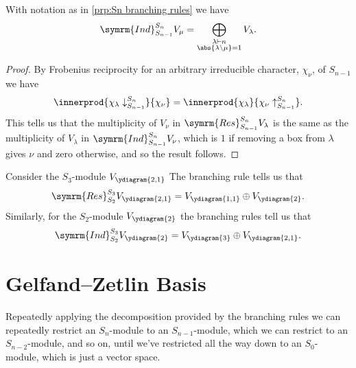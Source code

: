 \documentclass[fleqn]{NotesClass}
\newcommand{\partition}{\vdash}
\newcommand{\Res}{\symrm{Res}}
\newcommand{\Ind}{\symrm{Ind}}
\begin{document}
    
    \begin{crl}{}{}
        With notation as in \cref{prp:Sn branching rules} we have
        \begin{equation}
            \Ind^{S_n}_{S_{n-1}} V_\mu = \bigoplus_{\substack{\lambda \partition n\\ \abs{\lambda\setminus \mu} = 1}} V_\lambda.
        \end{equation}
        \begin{proof}
            By Frobenius reciprocity for an arbitrary irreducible character, \(\chi_\nu\), of \(S_{n-1}\) we have
            \begin{equation}
                \innerprod{\chi_\lambda\downarrow^{S_n}_{S_{n-1}}}{\chi_\nu} = \innerprod{\chi_\lambda}{\chi_\nu\uparrow^{S_n}_{S_{n-1}}}.
            \end{equation}
            This tells us that the multiplicity of \(V_\nu\) in \(\Res^{S_n}_{S_{n-1}}V_\lambda\) is the same as the multiplicity of \(V_\lambda\) in \(\Ind^{S_n}_{S_{n-1}}V_\nu\), which is \(1\) if removing a box from \(\lambda\) gives \(\nu\) and zero otherwise, and so the result follows.
        \end{proof}
    \end{crl}
    
    \begin{exm}{}{}
        Consider the \(S_3\)-module \(V_{\ydiagram{2,1}}\)
        The branching rule tells us that
        \begin{equation}
            \Res^{S_3}_{S_2} V_{\ydiagram{2,1}} = V_{\ydiagram{1,1}} \oplus V_{\ydiagram{2}}.
        \end{equation}
        Similarly, for the \(S_2\)-module \(V_{\ydiagram{2}}\) the branching rules tell us that
        \begin{equation}
            \Ind^{S_3}_{S_2} V_{\ydiagram{2}} = V_{\ydiagram{3}} \oplus V_{\ydiagram{2,1}}.
        \end{equation}
    \end{exm}
    
    \section{Gelfand--Zetlin Basis}
    Repeatedly applying the decomposition provided by the branching rules we can repeatedly restrict an \(S_n\)-module to an \(S_{n-1}\)-module, which we can restrict to an \(S_{n-2}\)-module, and so on, until we've restricted all the way down to an \(S_0\)-module, which is just a vector space.
    
\end{document}
